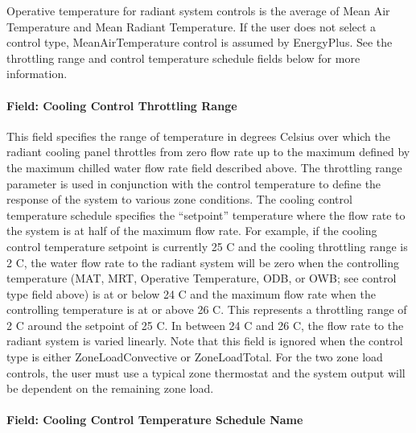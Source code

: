 Operative temperature for radiant system controls is the average of Mean Air Temperature and Mean Radiant Temperature. If the user does not select a control type, MeanAirTemperature control is assumed by EnergyPlus. See the throttling range and control temperature schedule fields below for more information.

\paragraph{Field: Cooling Control Throttling Range}

This field specifies the range of temperature in degrees Celsius over which the radiant cooling panel throttles from zero flow rate up to the maximum defined by the maximum chilled water flow rate field described above. The throttling range parameter is used in conjunction with the control temperature to define the response of the system to various zone conditions. The cooling control temperature schedule specifies the “setpoint” temperature where the flow rate to the system is at half of the maximum flow rate. For example, if the cooling control temperature setpoint is currently 25 C and the cooling throttling range is 2 C, the water flow rate to the radiant system will be zero when the controlling temperature (MAT, MRT, Operative Temperature, ODB, or OWB; see control type field above) is at or below 24 C and the maximum flow rate when the controlling temperature is at or above 26 C. This represents a throttling range of 2 C around the setpoint of 25 C. In between 24 C and 26 C, the flow rate to the radiant system is varied linearly.  Note that this field is ignored when the control type is either ZoneLoadConvective or ZoneLoadTotal.  For the two zone load controls, the user must use a typical zone thermostat and the system output will be dependent on the remaining zone load.

\paragraph{Field: Cooling Control Temperature Schedule Name}

